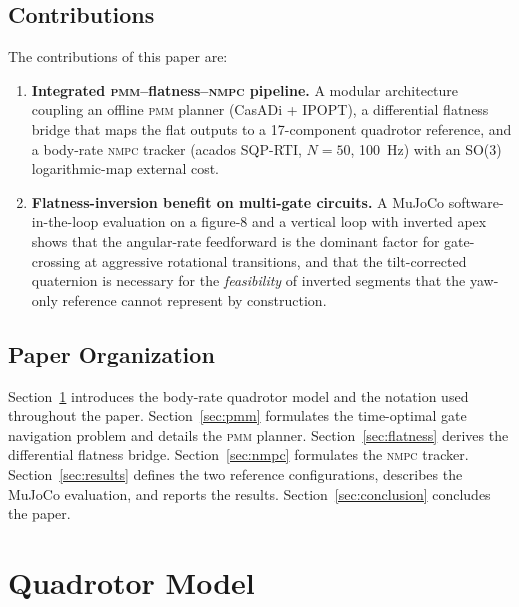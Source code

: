 \documentclass{ieeeaccess}
\newcommand{\pmm}{\textsc{pmm}}
\newcommand{\nmpc}{\textsc{nmpc}}
\newcommand{\mujoco}{MuJoCo}
\begin{document}
\subsection{Contributions}
\label{subsec:contributions}

The contributions of this paper are:

\begin{enumerate}

\item \textbf{Integrated \pmm{}--flatness--\nmpc{} pipeline.}
      A modular architecture coupling an offline \pmm{} planner
      (CasADi + IPOPT), a differential flatness bridge that maps the
      flat outputs to a 17-component quadrotor reference, and a
      body-rate \nmpc{} tracker (acados SQP-RTI, $N=50$, \SI{100}{\hertz})
      with an SO(3) logarithmic-map external cost.

\item \textbf{Flatness-inversion benefit on multi-gate circuits.}
      A \mujoco{} software-in-the-loop evaluation on a figure-8 and a
      vertical loop with inverted apex shows that the angular-rate
      feedforward is the dominant factor for gate-crossing at
      aggressive rotational transitions, and that the tilt-corrected
      quaternion is necessary for the \emph{feasibility} of inverted
      segments that the yaw-only reference cannot represent by
      construction.

\end{enumerate}

\subsection{Paper Organization}
\label{subsec:organization}

Section~\ref{sec:model} introduces the body-rate quadrotor model and
the notation used throughout the paper.
Section~\ref{sec:pmm} formulates the time-optimal gate navigation
problem and details the \pmm{} planner.
Section~\ref{sec:flatness} derives the differential flatness bridge.
Section~\ref{sec:nmpc} formulates the \nmpc{} tracker.
Section~\ref{sec:results} defines the two reference configurations,
describes the \mujoco{} evaluation, and reports the results.
Section~\ref{sec:conclusion} concludes the paper.

\section{Quadrotor Model}
\label{sec:model}
\end{document}
